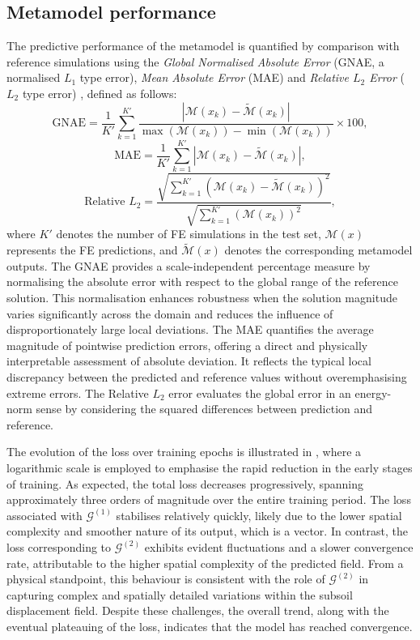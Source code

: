 \subsection{Metamodel performance}\noindent
The predictive performance of the metamodel is quantified by comparison with reference simulations using the \textit{Global Normalised Absolute Error} (GNAE, a normalised $L_1$ type error), \textit{Mean Absolute Error} (MAE) and \textit{Relative $L_2$ Error} ($L_2$ type error) \parencite{chai2014,mendo2009,zhu2019}, defined as follows:
\begin{equation}
 \text{GNAE} = \frac{1}{K'} \sum_{k=1}^{K'} \frac{ \left| \mathcal{M}(x_k) - \tilde{\mathcal{M}}(x_k) \right| } {\max(\mathcal{M}(x_k)) - \min(\mathcal{M}(x_k))} \times 100 , 
\end{equation}
\begin{equation}
\text{MAE}
=
\frac{1}{K'}
\sum_{k=1}^{K'}
\left|
\mathcal{M}(x_k) - \tilde{\mathcal{M}}(x_k)
\right|, 
\end{equation}
\begin{equation}
\text{Relative } L_2
=
\frac{
\sqrt{
\sum_{k=1}^{K'}
\left(
\mathcal{M}(x_k)
-
\tilde{\mathcal{M}}(x_k)
\right)^2
}
}
{
\sqrt{
\sum_{k=1}^{K'}
\left(
\mathcal{M}(x_k)
\right)^2
}
}
, 
\end{equation}
where $K'$ denotes the number of FE simulations in the test set, $\mathcal{M}(x)$ represents the FE predictions, and $\tilde{\mathcal{M}}(x)$ denotes the corresponding metamodel outputs. The GNAE provides a scale-independent percentage measure by normalising the absolute error with respect to the global range of the reference solution. This normalisation enhances robustness when the solution magnitude varies significantly across the domain and reduces the influence of disproportionately large local deviations. The MAE quantifies the average magnitude of pointwise prediction errors, offering a direct and physically interpretable assessment of absolute deviation. It reflects the typical local discrepancy between the predicted and reference values without overemphasising extreme errors. The Relative $L_2$ error evaluates the global error in an energy-norm sense by considering the squared differences between prediction and reference.

The evolution of the loss over training epochs is illustrated in , where a logarithmic scale is employed to emphasise the rapid reduction in the early stages of training. As expected, the total loss decreases progressively, spanning approximately three orders of magnitude over the entire training period. The loss associated with $\mathcal{G}^{(1)}$ stabilises relatively quickly, likely due to the lower spatial complexity and smoother nature of its output, which is a vector. In contrast, the loss corresponding to $\mathcal{G}^{(2)}$ exhibits evident fluctuations and a slower convergence rate, attributable to the higher spatial complexity of the predicted field. From a physical standpoint, this behaviour is consistent with the role of $\mathcal{G}^{(2)}$ in capturing complex and spatially detailed variations within the subsoil displacement field. Despite these challenges, the overall trend, along with the eventual plateauing of the loss, indicates that the model has reached convergence.


